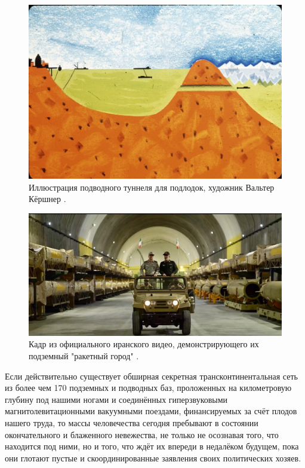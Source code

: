 \documentclass[10pt,twocolumn,letterpaper]{article}
\begin{document}
\begin{figure}[t]
\begin{center}
   \includegraphics[width=1\linewidth]{sub.jpg}
\end{center}
   \caption{Иллюстрация подводного туннеля для подлодок, художник Вальтер Кёршнер \cite{22,23}.}
\label{fig:6}
\label{fig:onecol}

\end{figure}

\begin{figure}[t]
\begin{center}
   \includegraphics[width=1\linewidth]{iran.jpeg}
\end{center}
   \caption{Кадр из официального иранского видео, демонстрирующего их подземный "ракетный город" \cite{39,40}.}
\label{fig:12}
\label{fig:onecol}
\end{figure}

Если действительно существует обширная секретная трансконтинентальная сеть из более чем 170 подземных и подводных баз, проложенных на километровую глубину под нашими ногами и соединённых гиперзвуковыми магнитолевитационными вакуумными поездами, финансируемых за счёт плодов нашего труда, то массы человечества сегодня пребывают в состоянии окончательного и блаженного невежества, не только не осознавая того, что находится под ними, но и того, что ждёт их впереди в недалёком будущем, пока они глотают пустые и скоординированные заявления своих политических хозяев.
\end{document}
